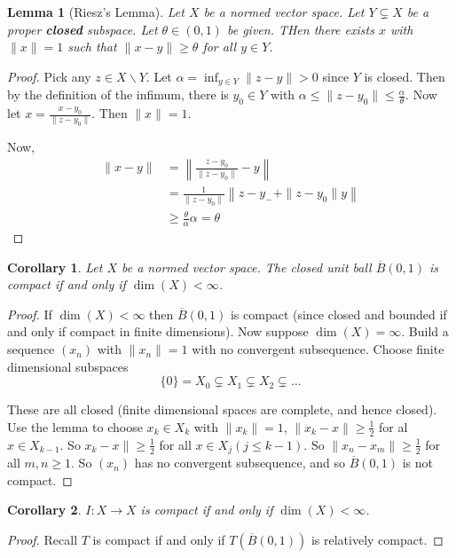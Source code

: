 \documentclass[10pt, oneside, reqno]{amsart}
\theoremstyle{plain}%
\newtheorem{lem}[thm]{Lemma}
\newtheorem*{cor}{Corollary}
\theoremstyle{definition}
\theoremstyle{remark}
\begin{document}
\begin{lem}[Riesz's Lemma]
    Let $X$ be a normed vector space.  Let $Y \subsetneq X$ be a proper \textbf{closed} subspace.  Let $\theta \in (0, 1)$ be given. THen there exists $x$ with $\| x \| = 1$ such that $\| x - y \| \geq \theta$ for all $y \in Y$.  
\end{lem}
\begin{proof}
    Pick any $z \in X \backslash Y$.  Let $\alpha = \inf_{y \in Y} \| z - y \| > 0$ since $Y$ is closed.  Then by the definition of the infimum, there is $y_0 \in Y$ with $\alpha \leq \| z - y_0 \| \leq \frac{\alpha}{\theta}$.  Now let $x = \frac{x - y_0}{\| z - y_0 \|}$.  Then $\| x \| = 1$.  
    
    Now, \begin{align*}
        \| x - y \| &= \left \| \frac{z - y_0}{\| z - y_0 \|} - y \right \| \\
                    &= \frac{1}{\| z - y_0 \|} \left \| z - y_- + \| z - y_0 \| y \right \| \\
                    &\geq \frac{\theta}{\alpha} \alpha = \theta
    \end{align*}
\end{proof}

\begin{cor}
    Let $X$ be a normed vector space.  The closed unit ball $\overline B(0, 1)$ is compact if and only if $\dim(X) < \infty$.  
\end{cor}
\begin{proof}
    If $\dim(X) < \infty$ then $\overline B(0, 1)$ is compact (since closed and bounded if and only if compact in finite dimensions).  Now suppose $\dim(X) = \infty$.  Build a sequence $(x_n)$ with $\| x_n \| = 1$ with no convergent subsequence.  Choose finite dimensional subspaces \[
        \{ 0 \} = X_0 \subsetneq X_1 \subsetneq X_2 \subsetneq \dots
    \]  
    
    These are all closed (finite dimensional spaces are complete, and hence closed).  Use the lemma to choose $x_k \in X_k$ with $\| x_k \| = 1$, $\| x_k - x \| \geq \frac{1}{2}$ for al $ x \in X_{k-1}$.  So $x_k - x \| \geq \frac{1}{2}$ for all $x \in X_j (j \leq k - 1)$.  So $\| x_n - x_m \| \geq \frac{1}{2}$ for all $m , n \geq 1$.  So $(x_n)$ has no convergent subsequence, and so $\overline B(0, 1)$ is not compact.  
\end{proof}
\begin{cor}
    $I : X \rightarrow X$ is compact if and only if $\dim(X) < \infty$.  
\end{cor}
\begin{proof}
    Recall $T$ is compact if and only if $T(\overline B(0, 1))$ is relatively compact.  
\end{proof}
\end{document}
